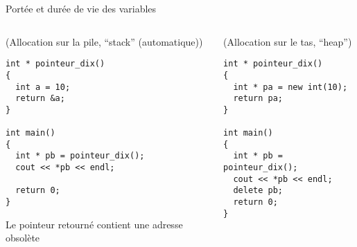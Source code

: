 \documentclass[c]{beamer}
\begin{document}
\begin{frame}[fragile]{Portée et durée de vie des variables}
 \begin{columns}
\begin{column}{0.7\columnwidth}
\begin{cbox}[][lwuc][\footnotesize](Allocation sur la pile, “stack” (automatique))
\begin{verbatim}
int * pointeur_dix()
{
  int a = 10;
  return &a;
}

int main()
{
  int * pb = pointeur_dix();
  cout << *pb << endl;

  return 0;
}
\end{verbatim}

\begin{cbox}[5][lrtuc][\centering][3.5][7]
Le pointeur retourné contient une adresse obsolète
\end{cbox}

\pause
\end{cbox}
\end{column}

\begin{column}{0.6\columnwidth}
\begin{cbox}[][lwuc][\footnotesize](Allocation sur le tas, “heap”)
\begin{verbatim}
int * pointeur_dix()
{
  int * pa = new int(10);
  return pa;
}

int main()
{
  int * pb = pointeur_dix();
  cout << *pb << endl;
  delete pb;
  return 0;
}
\end{verbatim}
\end{cbox}
\end{column}
\end{columns}
\end{frame}

\end{document}
